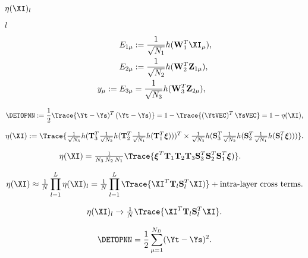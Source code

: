 $\eta(\XI)_{l}$

$l$

\begin{align}
\nonumber
  E_{1\mu} &:= \frac{1}{\sqrt{N_1}} h (\mathbf{W}_1^T \XI_{\mu}) , \\ 
\nonumber
  E_{2\mu} &:= \frac{1}{\sqrt{N_2}} h (\mathbf{W}_2^T \mathbf{Z}_{1\mu})     , \\ 
\label{eqn:nflow}
             y_{\mu} := E_{3\mu} &= \frac{1}{\sqrt{N_3}} h (\mathbf{W}_{3}^T \mathbf{Z}_{2\mu})     , 
\end{align}

\begin{align}
\label{eqn:DE2}
\DETOPNN
   := \frac{1}{2} \Trace{ \Yt- \Ys)^T \, (\Yt - \Ys) } 
   = 1 - \Trace{ (\YtVEC)^{T} \, \YsVEC  } 
   = 1 - \eta(\XI),
\end{align}

\begin{align} 
\label{eqn:overlap1}
  \eta(\XI) := \Trace{ \tfrac{1}{\sqrt{N_3}}  h(\mathbf{T}^T_3 \tfrac{1}{\sqrt{N_2} } h(\mathbf{T}_2^T 
    \tfrac{1}{\sqrt{N_1} } h(\mathbf{T}_1^{T}\boldsymbol{\xi} ) ) )^{T}
    \times
               \tfrac{1}{\sqrt{N_3}} h(\mathbf{S}^T_3 \tfrac{1}{\sqrt{N_2} } h(\mathbf{S}_2^T 
               \tfrac{1}{\sqrt{N_1} } h(\mathbf{S}_1^{T}\boldsymbol{\xi} ) ) )   }  .
\end{align}

\begin{align} 
\label{eqn:overlap2}
  \eta(\XI) &= \tfrac{1}{N_3 \, N_2 \, N_1} \Trace{ \boldsymbol{\xi}^T \mathbf{T}_1 \mathbf{T}_2 \mathbf{T}_3 \mathbf{S}^T_3 \mathbf{S}_2^T \mathbf{S}_1^T \boldsymbol{\xi}) }  .
\end{align}

\begin{align}
\eta(\XI)\approx\tfrac{1}{N}\prod_{l=1}^{L}\eta(\XI)_{l}=\tfrac{1}{N}\prod_{l=1}^{L}\Trace{ \XI^T \mathbf{T}_{l} \mathbf{S}_{l}^{T} \XI) } +\text{intra-layer cross terms}.
\end{align}

\begin{align}
        \eta(\XI)_{l}\rightarrow \tfrac{1}{N} \Trace{ \XI^T \mathbf{T}_{l} \mathbf{S}_{l}^{T} \XI }  .
\end{align}

\begin{equation} 
\label{eqn:DE}
\DETOPNN = \frac{1}{2}\sum_{\mu=1}^{N_{D}}(\Yt - \Ys)^2 . 
\end{equation}


